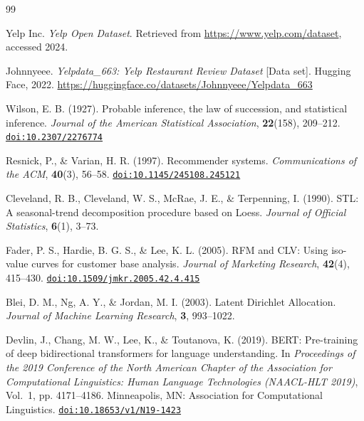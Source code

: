\documentclass[12pt, a4paper]{article}
\newcommand{\doi}[1]{\href{https://doi.org/#1}{\texttt{doi:#1}}}
\begin{document}
\newpage
\renewcommand{\refname}{参考材料}
\begin{thebibliography}{99}


Yelp Inc.
\textit{Yelp Open Dataset}.
Retrieved from \url{https://www.yelp.com/dataset}, accessed 2024.

Johnnyeee.
\textit{Yelpdata\_663: Yelp Restaurant Review Dataset} [Data set].
Hugging Face, 2022.
\url{https://huggingface.co/datasets/Johnnyeee/Yelpdata_663}


Wilson, E. B. (1927).
Probable inference, the law of succession, and statistical inference.
\textit{Journal of the American Statistical Association}, \textbf{22}(158), 209--212.
\doi{10.2307/2276774}

Resnick, P., \& Varian, H. R. (1997).
Recommender systems.
\textit{Communications of the ACM}, \textbf{40}(3), 56--58.
\doi{10.1145/245108.245121}


Cleveland, R. B., Cleveland, W. S., McRae, J. E., \& Terpenning, I. (1990).
STL: A seasonal-trend decomposition procedure based on Loess.
\textit{Journal of Official Statistics}, \textbf{6}(1), 3--73.


Fader, P. S., Hardie, B. G. S., \& Lee, K. L. (2005).
RFM and CLV: Using iso-value curves for customer base analysis.
\textit{Journal of Marketing Research}, \textbf{42}(4), 415--430.
\doi{10.1509/jmkr.2005.42.4.415}


Blei, D. M., Ng, A. Y., \& Jordan, M. I. (2003).
Latent Dirichlet Allocation.
\textit{Journal of Machine Learning Research}, \textbf{3}, 993--1022.

Devlin, J., Chang, M. W., Lee, K., \& Toutanova, K. (2019).
BERT: Pre-training of deep bidirectional transformers for language understanding.
In \textit{Proceedings of the 2019 Conference of the North American Chapter
of the Association for Computational Linguistics: Human Language Technologies
(NAACL-HLT 2019)}, Vol.\ 1, pp. 4171--4186.
Minneapolis, MN: Association for Computational Linguistics.
\doi{10.18653/v1/N19-1423}


\end{thebibliography}
\end{document}
